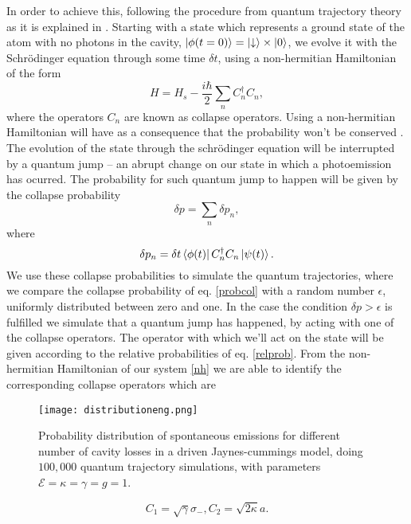 \documentclass[conference]{IEEEtran}
\begin{document}
In order to achieve this, following the procedure from quantum trajectory theory as it is explained in \cite{bla}. Starting with a state which represents a ground state of the atom with no photons in the cavity, $\ket{\phi(t = 0)} = \ket{\downarrow} \times \ket{0}$, we evolve it with the Schrödinger equation through some time $\delta t$, using a non-hermitian Hamiltonian of the form
\begin{equation}
H = H_s - \frac{i\hbar}{2}\sum_n C^\dagger_n C_n,
\end{equation}
where the operators $C_n$ are known as collapse operators.
Using a non-hermitian Hamiltonian will have as a consequence that the probability won't be conserved \cite{Sakurai:1167961}. The evolution of the state through the schrödinger equation will be interrupted by a quantum jump – an abrupt change on our state in which a photoemission has ocurred. The probability for such quantum jump to happen will be given by the collapse probability
\begin{equation} \label{probcol}
\delta p = \sum_n \delta p_n,
\end{equation}
where 
\begin{equation} \label{relprob}
\delta p_n = \delta t \bra{\phi (t)} C^\dagger_n C_n \ket{\psi (t)}.
\end{equation}
We use these collapse probabilities to simulate the quantum trajectories, where we compare the collapse probability of eq. \eqref{probcol} with a random number $\epsilon$, uniformly distributed between zero and one. In the case the condition $\delta p > \epsilon$ is fulfilled we simulate that a quantum jump has happened, by acting with one of the collapse operators. The operator with which we'll act on the state will be given according to the relative probabilities of eq. \eqref{relprob}. From the non-hermitian Hamiltonian of our system \eqref{nh} we are able to identify the corresponding collapse operators which are
\begin{figure}[!t] 
\centering
\texttt{[image: distributioneng.png]}
\caption{\small{Probability distribution of spontaneous emissions for different number of cavity losses in a driven Jaynes-cummings model, doing $100,000$ quantum trajectory simulations, with parameters $\mathcal{E}  = \kappa = \gamma = g = 1$.}} \label{probdiss}
\end{figure}
\begin{subequations}
\begin{equation}
C_1 = \sqrt{\gamma}\sigma_-,
\end{equation}
\begin{equation}
C_2 = \sqrt{2\kappa}a.
\end{equation}
\end{subequations}
\end{document}
